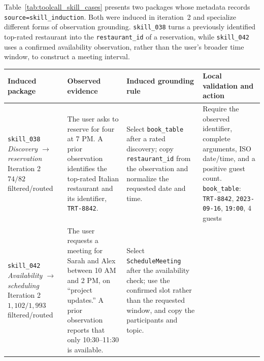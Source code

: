 Table~\ref{tab:toolcall_skill_cases} presents two packages whose metadata records \texttt{source=skill\_induction}. Both were induced in iteration~2 and specialize different forms of observation grounding. \texttt{skill\_038} turns a previously identified top-rated restaurant into the \texttt{restaurant\_id} of a reservation, while \texttt{skill\_042} uses a confirmed availability observation, rather than the user's broader time window, to construct a meeting interval.

\begin{table}[htbp]
    \centering
    \small
    \renewcommand{\arraystretch}{1.22}
    \setlength{\tabcolsep}{3.5pt}
    \begin{tabular*}{\textwidth}{@{\extracolsep{\fill}} >{\raggedright\arraybackslash}p{} >{\raggedright\arraybackslash}p{} >{\raggedright\arraybackslash}p{} >{\raggedright\arraybackslash}p{}}
        \toprule
        \textbf{Induced package} & \textbf{Observed evidence} & \textbf{Induced grounding rule} & \textbf{Local validation and action} \\
        \midrule
        \texttt{skill\_038}\newline
        \emph{Discovery $\rightarrow$ reservation}\newline
        Iteration 2\newline
        $74/82$ filtered/routed
        & The user asks to reserve for four at 7 PM. A prior observation identifies the top-rated Italian restaurant and its identifier, \texttt{TRT-8842}.
        & Select \texttt{book\_table} after a rated discovery; copy \texttt{restaurant\_id} from the observation and normalize the requested date and time.
        & Require the observed identifier, complete arguments, ISO date/time, and a positive guest count.\newline
        \texttt{book\_table}: \texttt{TRT-8842}, \texttt{2023-09-16}, \texttt{19:00}, $4$ guests \\
        \addlinespace[0.45em]
        \texttt{skill\_042}\newline
        \emph{Availability $\rightarrow$ scheduling}\newline
        Iteration 2\newline
        $1{,}102/1{,}993$ filtered/routed
        & The user requests a meeting for Sarah and Alex between 10 AM and 2 PM, on ``project updates.'' A prior observation reports that only 10:30--11:30 is available.
        & Select \texttt{ScheduleMeeting} after the availability check; use the confirmed slot rather than the requested window, and copy the participants and topic.

\end{tabular*}
\end{table}
